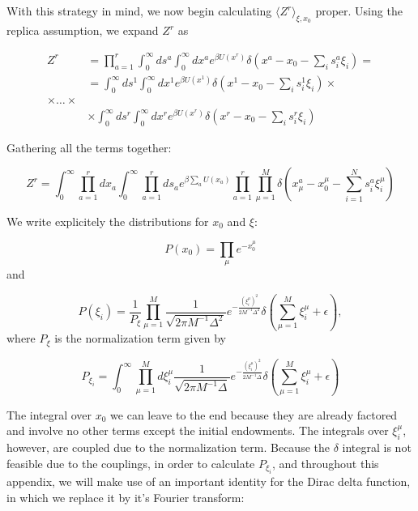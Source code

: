 With this strategy in mind, we now begin calculating $\langle Z^r
\rangle_{\xi, x_0}$ proper. Using the replica assumption, we expand
$Z^r$ as

\begin{align}
    \label{eq:a_23}
    Z^r & = \prod_{a=1}^r \int_0^\infty ds^a \int_0^\infty dx^a e^{\beta U(x^r)}
    \delta\left(x^a - x_0 - \sum_i s^a_i \xi_i \right) = \\
   & = \int_0^\infty ds^1 \int_0^\infty dx^1 e^{\beta U(x^1)}
    \delta\left(x^1 - x_0 - \sum_i s^1_i \xi_i \right) \times \\
  \times \ldots \times \\
        &\times \int_0^\infty ds^r \int_0^\infty dx^r e^{\beta U(x^r)}
    \delta\left(x^r - x_0 - \sum_i s^r_i \xi_i \right) \nonumber
\end{align}

Gathering all the terms together:

  \begin{equation}
    \label{eq:a_22}
    Z^r = \int_0^\infty \prod_{a=1}^r d x_a \int_0^\infty 
    \prod_{a=1}^r d s_a e^{\beta \sum_a U(x_a)} \prod_{a=1}^r
    \prod_{\mu=1}^M \delta \left( x_\mu^a - x_0^\mu - \sum_{i=1}^N s_i^a \xi_i^\mu\right)
  \end{equation}


We write explicitely the distributions for $x_0$ and $\xi$:

\begin{equation}
    \label{eq:a_24}
    P(x_0) = \prod_\mu e^{-x_0^\mu}
\end{equation}
and

\begin{equation}
    \label{eq:a_25}
    P(\xi_i) = \frac{1}{P_\xi} \prod_{\mu=1}^M \frac{1}{\sqrt{2\pi M^{-1} \Delta^2}}e^{-\frac{(\xi_i^\mu)^2}{2M^{-1}\Delta^2}}
    \delta\left(\sum_{\mu=1}^M \xi_i^\mu + \epsilon\right),
\end{equation}
where $P_\xi$ is the normalization term given by

\begin{equation}
  \label{eq:a_26}
  P_{\xi_i} = \int_0^\infty \prod_{\mu=1}^M d\xi_i^\mu \frac{1}{\sqrt{2\pi M^{-1}\Delta}}e^{-\frac{(\xi_i^\mu)^2}{2 M^{-1}\Delta}}
    \delta\left(\sum_{\mu=1}^M \xi_i^\mu + \epsilon\right)
\end{equation}

The integral over $x_0$ we can leave to the end because they are
already factored and involve no other terms except the initial
endowments. The integrals over $\xi_i^\mu$, however, are coupled due
to the normalization term. Because the $\delta$ integral is not
feasible due to the couplings, in order to calculate $P_{\xi_i}$, and throughout
this appendix, we will make use of an important identity for the Dirac
delta function, in which we replace it by it's Fourier transform:

